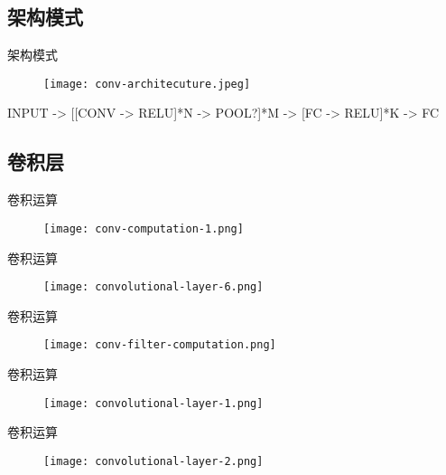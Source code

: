 \subsection{架构模式}

\begin{frame}[fragile]{架构模式}
  \begin{figure}
    \centering
    \texttt{[image: conv-architecuture.jpeg]}
  \end{figure}

  \begin{python}
INPUT -> [[CONV -> RELU]*N -> POOL?]*M -> [FC -> RELU]*K -> FC
  \end{python}  
\end{frame}

\subsection{卷积层}

\begin{frame}[fragile]{卷积运算}
  \begin{figure}
    \centering
    \texttt{[image: conv-computation-1.png]}
  \end{figure}
\end{frame}

\begin{frame}[fragile]{卷积运算}
  \begin{figure}
    \centering
    \texttt{[image: convolutional-layer-6.png]}
  \end{figure}
\end{frame}

\begin{frame}[fragile]{卷积运算}
  \begin{figure}
    \centering
    \texttt{[image: conv-filter-computation.png]}
  \end{figure}
\end{frame}

\begin{frame}[fragile]{卷积运算}
  \begin{figure}
    \centering
    \texttt{[image: convolutional-layer-1.png]}
  \end{figure}
\end{frame}

\begin{frame}[fragile]{卷积运算}
  \begin{figure}
    \centering
    \texttt{[image: convolutional-layer-2.png]}
  \end{figure}
\end{frame}

